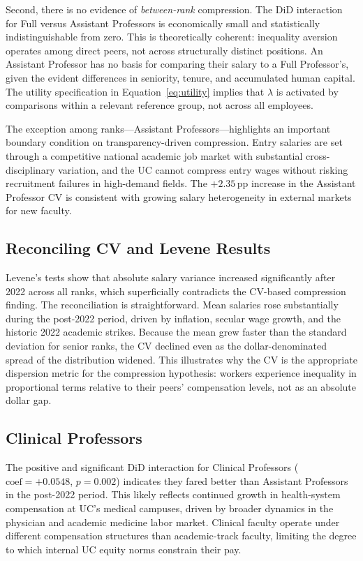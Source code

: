 \documentclass[12pt]{article}
\begin{document}
Second, there is no evidence of \emph{between-rank} compression. The DiD
interaction for Full versus Assistant Professors is economically small
and statistically indistinguishable from zero. This is theoretically
coherent: inequality aversion operates among direct peers, not across
structurally distinct positions. An Assistant Professor has no basis for
comparing their salary to a Full Professor's, given the evident
differences in seniority, tenure, and accumulated human capital. The
utility specification in Equation~\eqref{eq:utility} implies that
$\lambda$ is activated by comparisons within a relevant reference group,
not across all employees.

The exception among ranks---Assistant Professors---highlights an
important boundary condition on transparency-driven compression. Entry
salaries are set through a competitive national academic job market with
substantial cross-disciplinary variation, and the UC cannot compress
entry wages without risking recruitment failures in high-demand fields.
The $+2.35$\,pp increase in the Assistant Professor CV is consistent
with growing salary heterogeneity in external markets for new faculty.

\subsection{Reconciling CV and Levene Results}

Levene's tests show that absolute salary variance increased significantly
after 2022 across all ranks, which superficially contradicts the
CV-based compression finding. The reconciliation is straightforward.
Mean salaries rose substantially during the post-2022 period, driven by
inflation, secular wage growth, and the historic 2022 academic strikes.
Because the mean grew faster than the standard deviation for senior
ranks, the CV declined even as the dollar-denominated spread of the
distribution widened. This illustrates why the CV is the appropriate
dispersion metric for the compression hypothesis: workers experience
inequality in proportional terms relative to their peers' compensation
levels, not as an absolute dollar gap.

\subsection{Clinical Professors}

The positive and significant DiD interaction for Clinical Professors
($\text{coef} = +0.0548$, $p = 0.002$) indicates they fared better than
Assistant Professors in the post-2022 period. This likely reflects
continued growth in health-system compensation at UC's medical campuses,
driven by broader dynamics in the physician and academic medicine labor
market. Clinical faculty operate under different compensation structures
than academic-track faculty, limiting the degree to which internal UC
equity norms constrain their pay.
\end{document}
